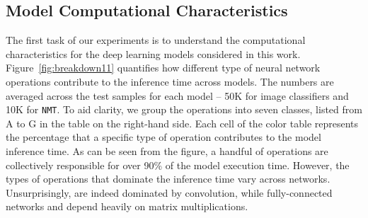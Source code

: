 \subsection{Model Computational Characteristics}
The first task of our experiments is to understand the computational characteristics for the deep learning models considered in this work.
Figure~\ref{fig:breakdown11} quantifies how different type of neural network operations contribute to the inference time across models. The
numbers are averaged across the test samples for each model -- 50K for image classifiers and 10K for \texttt{NMT}. To aid clarity, we group
the operations into seven classes, listed from A to G in the table on the right-hand side. Each cell of the color table represents the
percentage that a specific type of operation contributes to the model inference time. As can be seen from the figure, a handful of
operations are collectively responsible for over 90\% of the model execution time. However, the types of operations that dominate the
inference time vary across networks. Unsurprisingly, \CNNs are indeed dominated by convolution, while fully-connected networks and \RNNs
depend heavily on matrix multiplications.

